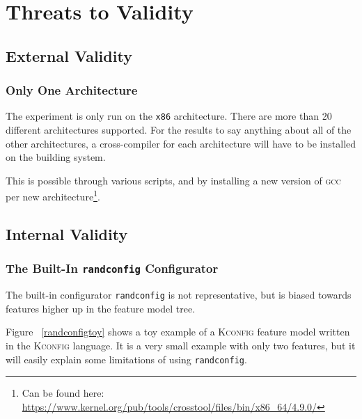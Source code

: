 \documentclass[a4paper,11pt]{report}
\newcommand{\f}{\footnote{\fn}}
\begin{document}
            \chapter{Threats to Validity}
            \label{ch:ttv}


            \section{External Validity}
            \label{sec:extval}


            \subsection{Only One Architecture}

The experiment is only run on the \texttt{x86} architecture. There are more than
20 different architectures supported. For the results to say anything about all 
of the other architectures, a cross-compiler for each architecture will have to
be installed on the building system.

            \def \fn {Can be found here: 
            \url{https://www.kernel.org/pub/tools/crosstool/files/bin/x86_64/4.9.0/}}

This is possible through various scripts, and by installing a new version of
\textsc{gcc} per new architecture\f.



            \section{Internal Validity}
            \label{sec:intval}

            \subsection{The Built-In \texttt{randconfig} Configurator}
            \label{sec:randconfbias}

The built-in configurator \texttt{randconfig} is not representative, but is 
biased towards features higher up in the feature model tree. 

Figure ~\ref{randconfigtoy} shows a toy example of a \textsc{Kconfig} feature 
model written in the \textsc{Kconfig} language.  It is a very small example 
with only two features, but it will easily explain some limitations of using 
\texttt{randconfig}.
\\
\end{document}
